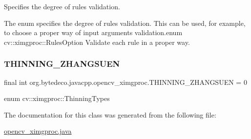 Specifies the degree of rules validation. 

The enum specifies the degree of rules validation. This can be used, for example, to choose a proper way of input arguments validation.\+enum cv\+::ximgproc\+::\+Rules\+Option Validate each rule in a proper way. \mbox{\label{classorg_1_1bytedeco_1_1javacpp_1_1opencv__ximgproc_a72f55e80b08dbd86f39919d518fda4fd}} 
\subsubsection{\texorpdfstring{T\+H\+I\+N\+N\+I\+N\+G\+\_\+\+Z\+H\+A\+N\+G\+S\+U\+EN}{THINNING\_ZHANGSUEN}}
{\footnotesize\ttfamily final int org.\+bytedeco.\+javacpp.\+opencv\+\_\+ximgproc.\+T\+H\+I\+N\+N\+I\+N\+G\+\_\+\+Z\+H\+A\+N\+G\+S\+U\+EN = 0\hspace{0.3cm}{\ttfamily [static]}}

enum cv\+::ximgproc\+::\+Thinning\+Types 

The documentation for this class was generated from the following file\+:\begin{DoxyCompactItemize}
\item 
\hyperlink{opencv__ximgproc_8java}{opencv\+\_\+ximgproc.\+java}\end{DoxyCompactItemize}
